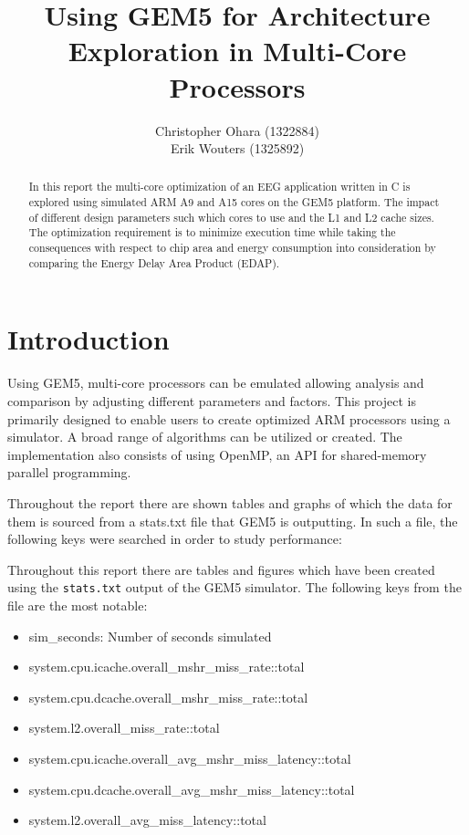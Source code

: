 \documentclass[a4paper, 10pt, conference]{ieeeconf}      %
\title{\LARGE \bf Using GEM5 for Architecture Exploration in Multi-Core Processors}
\author{Christopher Ohara (1322884) \\
Erik Wouters (1325892)
}
\begin{document}
\maketitle
\thispagestyle{empty}
\pagestyle{empty}

\begin{abstract}
In this report the multi-core optimization of an EEG application written in C is explored using simulated ARM A9 and A15 cores on the GEM5 platform. The impact of different design parameters such which cores to use and the L1 and L2 cache sizes. The optimization requirement is to minimize execution time while taking the consequences with respect to chip area and energy consumption into consideration by comparing the Energy Delay Area Product (EDAP).

\end{abstract}

\section{Introduction}
Using GEM5\cite{gem5}, multi-core processors can be emulated allowing analysis and comparison by adjusting different parameters and factors. This project is primarily designed to enable users to create optimized ARM processors using a simulator. A broad range of algorithms can be utilized or created. The implementation also consists of using OpenMP\cite{openmp}, an API for shared-memory parallel programming.

Throughout the report there are shown tables and
graphs of which the data for them is sourced from a
stats.txt file that GEM5 is outputting. In such a file,
the following keys were searched in order to study performance:


Throughout this report there are tables and figures which have been created using the \texttt{stats.txt} output of the GEM5 simulator. The following keys from the file are the most notable:
\begin{itemize}
    \item sim\_seconds: Number of seconds simulated
    \item system.cpu.icache.overall\_mshr\_miss\_rate::total
    \item system.cpu.dcache.overall\_mshr\_miss\_rate::total
    \item system.l2.overall\_miss\_rate::total
    \item system.cpu.icache.overall\_avg\_mshr\_miss\_latency::total
    \item system.cpu.dcache.overall\_avg\_mshr\_miss\_latency::total
    \item system.l2.overall\_avg\_miss\_latency::total
\end{itemize}
\end{document}
